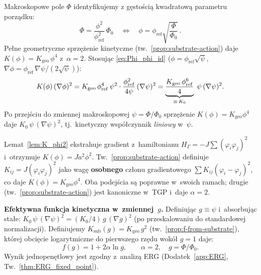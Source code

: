 Makroskopowe pole $\Phi$ identyfikujemy z gęstością kwadratową
parametru porządku:
\begin{equation}
  \Phi = \frac{\phi^2}{\phi_\mathrm{ref}^2}\,\Phi_0
  \quad\Longleftrightarrow\quad
  \phi = \phi_\mathrm{ref}\sqrt{\frac{\Phi}{\Phi_0}}\,.
  \label{eq:Phi_phi_id}
\end{equation}
Pełne geometryczne sprzężenie kinetyczne
(tw.~\ref{prop:substrate-action}) daje
$K(\phi) = K_\mathrm{geo}\,\phi^4$ z~$\alpha = 2$.
Stosując \eqref{eq:Phi_phi_id} ($\phi = \phi_\mathrm{ref}\sqrt{\psi}$,
$\nabla\phi = \phi_\mathrm{ref}\,\nabla\psi/(2\sqrt{\psi})$):
\begin{equation}
  K(\phi)\,(\nabla\phi)^2
  = K_\mathrm{geo}\,\phi_\mathrm{ref}^4\,\psi^2
    \cdot \frac{\phi_\mathrm{ref}^2}{4\psi}\,(\nabla\psi)^2
  = \underbrace{\frac{K_\mathrm{geo}\,\phi_\mathrm{ref}^6}{4}}_{%
    \equiv\,K_0}\;\psi\,(\nabla\psi)^2.
  \label{eq:kinetic_macro}
\end{equation}
Po przejściu do zmiennej makroskopowej $\psi = \Phi/\Phi_0$
sprzężenie $K(\phi) = K_\mathrm{geo}\phi^4$ daje
$K_0\,\psi\,(\nabla\psi)^2$, tj.\ kinetyczny współczynnik
\emph{liniowy} w~$\psi$.

\begin{uwaga}
Lemat~\ref{lem:K_phi2} ekstrahuje gradient z~hamiltonianu
$H_\Gamma = -J\!\sum(\varphi_i\varphi_j)^2$ i~otrzymuje
$K(\phi) = Ja^2\phi^2$. Tw.~\ref{prop:substrate-action}
definiuje $K_{ij} = J(\varphi_i\varphi_j)^2$ jako wagę
\textbf{osobnego} członu gradientowego
$\sum K_{ij}(\varphi_i{-}\varphi_j)^2$, co daje
$K(\phi) = K_\mathrm{geo}\phi^4$.
Oba podejścia są poprawne w~swoich ramach; drugie
(tw.~\ref{prop:substrate-action}) jest kanoniczne w~TGP
i~daje $\alpha = 2$.
\end{uwaga}

\medskip\noindent
\textbf{Efektywna funkcja kinetyczna w~zmiennej~$g$.}
Definiując $g \equiv \psi$ i~absorb\-ując stałe:
$K_0\,\psi\,(\nabla\psi)^2 = (K_0/4)\,g\,(\nabla g)^2$
(po przeskalowaniu do standardowej normalizacji).
Definiujemy $K_\mathrm{sub}(g) = K_\mathrm{geo}\,g^2$
(tw.~\ref{prop:f-from-substrate}), której obcięcie
logarytmiczne do pierwszego rzędu wokół $g = 1$ daje:
\begin{equation}
  \boxed{f(g) = 1 + 2\alpha\ln g,\qquad \alpha = 2,\quad g = \Phi/\Phi_0.}
  \label{eq:K_eff_1loop}
\end{equation}
Wynik jednopenętlowy jest zgodny z~analizą ERG
(Dodatek~\ref{app:ERG}, Tw.~\ref{thm:ERG_fixed_point}).

